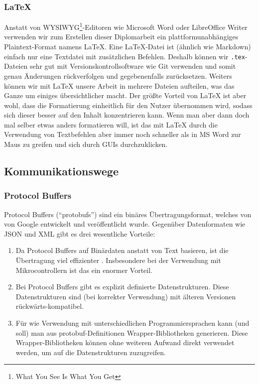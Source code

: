 \subsubsection{\LaTeX}
\label{subsec:latex}
Anstatt von WYSIWYG\footnote{What You See Is What You Get}-Editoren
wie Microsoft Word oder LibreOffice Writer verwenden wir zum Erstellen dieser Diplomarbeit
ein plattformunabhängiges Plaintext-Format namens \LaTeX.
Eine LaTeX-Datei ist (ähnlich wie Markdown) einfach nur eine Textdatei mit zusätzlichen Befehlen.
Deshalb können wir \texttt{.tex}-Dateien sehr gut mit Versionskontrollsoftware wie Git verwenden
und somit genau Änderungen rückverfolgen und gegebenenfalls zurücksetzen.
%
Weiters können wir mit LaTeX unsere Arbeit in mehrere Dateien aufteilen,
was das Ganze um einiges übersichtlicher macht.
%
Der größte Vorteil von LaTeX ist aber wohl,
dass die Formatierung einheitlich für den Nutzer übernommen wird,
sodass sich dieser besser auf den Inhalt konzentrieren kann.
%
Wenn man aber dann doch mal selber etwas anders formatieren will,
ist das mit LaTeX durch die Verwendung von Textbefehlen
aber immer noch schneller als in MS Word zur Maus zu greifen
und sich durch GUIs durchzuklicken. 

\subsection{Kommunikationswege}
\label{subsec:ueberblick_comms}

\subsubsection{Protocol Buffers}
\label{subsec:ueberblick_protobufs}
Protocol Buffers \cite{protobufs} (``protobufs'') sind ein binäres Übertragungsformat,
welches von von Google entwickelt und veröffentlicht wurde.
%
Gegenüber Datenformaten wie JSON und XML gibt es drei wesentliche Vorteile:
\begin{enumerate}
    \item Da Protocol Buffers auf Binärdaten anstatt von Text basieren,
    ist die Übertragung viel effizienter \cite{7765670}.
    Insbesondere bei der Verwendung mit Mikrocontrollern ist das ein enormer Vorteil.

    \item Bei Protocol Buffers gibt es explizit definierte Datenstrukturen.
    Diese Datenstrukturen sind (bei korrekter Verwendung) mit älteren Versionen rückwärts-kompatibel.

    \item Für wie Verwendung mit unterschiedlichen Programmiersprachen kann (und soll) man aus protobuf-Definitionen
    Wrapper-Bibliotheken generieren.
    Diese Wrapper-Bibliotheken können ohne weiteren Aufwand direkt verwendet werden,
    um auf die Datenstrukturen zuzugreifen.
\end{enumerate}

